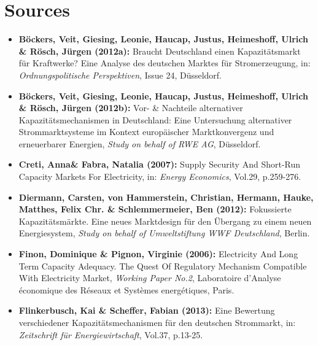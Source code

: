 \documentclass[11pt,a4paper,english]{scrreprt}
\begin{document}


\chapter{Sources}

  \begin{itemize}
	
	\sffamily
	

	\item [\Rectsteel] \textbf{B\"{o}ckers, Veit, Giesing, Leonie, Haucap,
Justus, Heimeshoff, Ulrich \& R\"{o}sch, J\"{u}rgen (2012a):} Braucht
Deutschland einen Kapazit\"{a}tsmarkt f\"{u}r Kraftwerke? Eine Analyse des
deutschen Marktes f\"{u}r Stromerzeugung, in: \textsl{Ordnungspolitische
Perspektiven}, Issue 24, D\"{u}sseldorf.


	\item [\Rectsteel] \textbf{B\"{o}ckers, Veit, Giesing, Leonie, Haucap,
Justus, Heimeshoff, Ulrich \& R\"{o}sch, J\"{u}rgen (2012b):} Vor- \& Nachteile
alternativer Kapazit\"{a}tsmechanismen in Deutschland: Eine Untersuchung
alternativer Strommarktsysteme im Kontext europ\"{a}ischer Marktkonvergenz und
erneuerbarer Energien, \textsl{Study on behalf of RWE AG}, D\"{u}sseldorf.



	\item [\Rectsteel] \textbf{Creti, Anna\& Fabra, Natalia (2007):} Supply
Security And Short-Run Capacity Markets For Electricity, in: \textsl{Energy
Economics}, Vol.29, p.259-276.
	

	\item [\Rectsteel] \textbf{Diermann, Carsten, von Hammerstein,
Christian, Hermann, Hauke, Matthes, Felix Chr. \& Schlemmermeier, Ben (2012):}
Fokussierte Kapazit\"atsm\"arkte. Eine neues Marktdesign f\"ur den \"Ubergang zu
einem neuen Energiesystem, \textsl{Study on behalf of Umweltstiftung WWF
Deutschland}, Berlin.	


	\item[\Rectsteel] \textbf{Finon, Dominique \& Pignon, Virginie (2006):}
Electricity And Long Term Capacity Adequacy. The Quest Of Regulatory Mechanism
Compatible With Electricity Market, \textsl{Working Paper No.2}, Laboratoire
d'Analyse \'{e}conomique des R\'{e}seaux et Syst\`{e}mes energ\'{e}tiques,
Paris.
	

	\item[\Rectsteel] \textbf{Flinkerbusch, Kai \& Scheffer, Fabian
(2013):} Eine Bewertung verschiedener Kapazit\"{a}tsmechanismen f\"{u}r den
deutschen Strommarkt, in: \textsl{Zeitschrift f\"{u}r Energiewirtschaft},
Vol.37, p.13-25.



\end{itemize}
\end{document}

